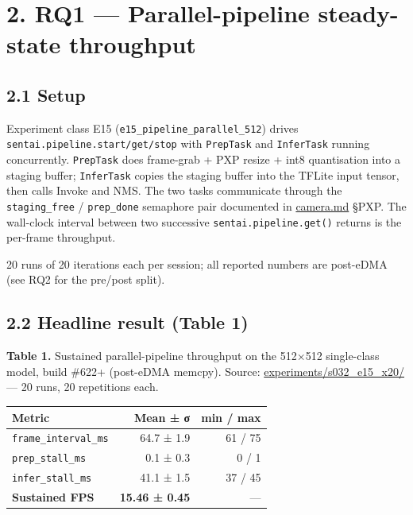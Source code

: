 \section{2. RQ1 --- Parallel-pipeline steady-state
throughput}\label{rq1-parallel-pipeline-steady-state-throughput}

\subsection{2.1 Setup}\label{setup}

Experiment class E15 (\texttt{e15\_pipeline\_parallel\_512}) drives
\texttt{sentai.pipeline.start/get/stop} with \texttt{PrepTask} and
\texttt{InferTask} running concurrently. \texttt{PrepTask} does
frame-grab + PXP resize + int8 quantisation into a staging buffer;
\texttt{InferTask} copies the staging buffer into the TFLite input
tensor, then calls Invoke and NMS. The two tasks communicate through the
\texttt{staging\_free} / \texttt{prep\_done} semaphore pair documented
in \url{camera.md} §PXP. The wall-clock interval between two successive
\texttt{sentai.pipeline.get()} returns is the per-frame throughput.

20 runs of 20 iterations each per session; all reported numbers are
post-eDMA (see RQ2 for the pre/post split).

\subsection{2.2 Headline result (Table
1)}\label{headline-result-table-1}

\textbf{Table 1.} Sustained parallel-pipeline throughput on the 512×512
single-class model, build \#622+ (post-eDMA memcpy). Source:
\href{../experiments/s032_e15_x20/}{experiments/s032\_e15\_x20/} --- 20
runs, 20 repetitions each.

{\def\LTcaptype{none} %
\begin{longtable}[]{@{}lrr@{}}
\toprule\noalign{}
Metric & Mean ± σ & min / max \\
\midrule\noalign{}
\endhead
\bottomrule\noalign{}
\endlastfoot
\texttt{frame\_interval\_ms} & 64.7 ± 1.9 & 61 / 75 \\
\texttt{prep\_stall\_ms} & 0.1 ± 0.3 & 0 / 1 \\
\texttt{infer\_stall\_ms} & 41.1 ± 1.5 & 37 / 45 \\
\textbf{Sustained FPS} & \textbf{15.46 ± 0.45} & --- \\
\end{longtable}
}

